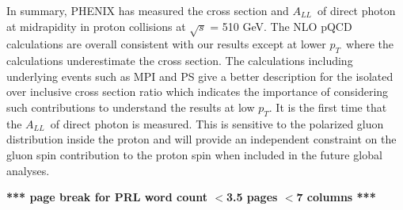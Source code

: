 \documentclass[twocolumn,letterpaper,aps,prl,longbibliography,superscriptaddress,floatfix]{revtex4-2}
\newcommand{\pT}{\ensuremath{p_T}}
\newcommand{\ALL}{\ensuremath{A_{LL}}}
\begin{document}
In summary, PHENIX has measured the cross section and \ALL\ of direct photon at midrapidity in proton collisions at $\sqrt{s}$ = 510 GeV. The NLO pQCD calculations are overall consistent with our results except at lower \pT\ where the calculations underestimate the cross section. The calculations including underlying events such as MPI and PS give a better description for the isolated over inclusive cross section ratio which indicates the importance of considering such contributions to understand the results at low $p_{T}$. It is the first time that the \ALL\ of direct photon is measured. This is sensitive to the polarized gluon distribution inside the proton and will provide an independent constraint on the gluon spin contribution to the proton spin when included in the future global analyses.

\clearpage \textbf{*** page break for PRL word count $<$3.5 pages $<$7 columns ***}




\end{document}
